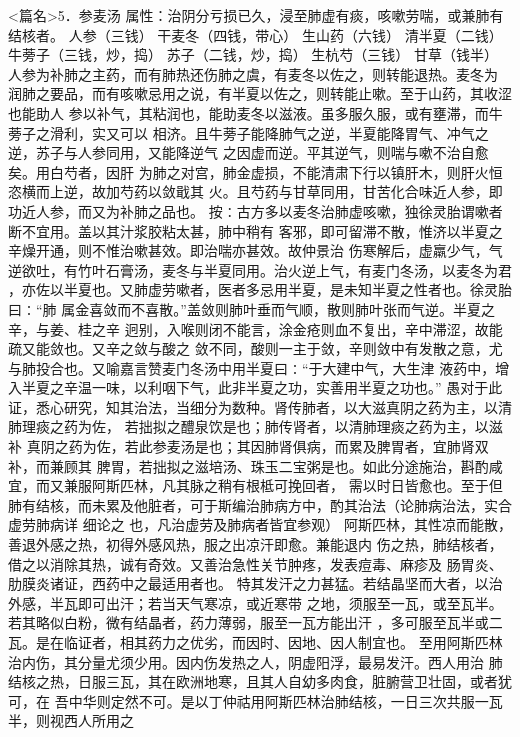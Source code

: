 \documentclass[a4paper,12pt,UTF8,twoside]{ctexbook}
\begin{document}
<篇名>5．参麦汤
属性：治阴分亏损已久，浸至肺虚有痰，咳嗽劳喘，或兼肺有结核者。 
人参（三钱） 干麦冬（四钱，带心） 生山药（六钱） 清半夏（二钱） 牛蒡子（三钱，炒，捣） 苏子（二钱，炒，捣） 
生杭芍（三钱） 甘草（钱半） 
人参为补肺之主药，而有肺热还伤肺之虞，有麦冬以佐之，则转能退热。麦冬为 
润肺之要品，而有咳嗽忌用之说，有半夏以佐之，则转能止嗽。至于山药，其收涩也能助人 
参以补气，其粘润也，能助麦冬以滋液。虽多服久服，或有壅滞，而牛蒡子之滑利，实又可以 
相济。且牛蒡子能降肺气之逆，半夏能降胃气、冲气之逆，苏子与人参同用，又能降逆气 
之因虚而逆。平其逆气，则喘与嗽不治自愈矣。用白芍者，因肝 
为肺之对宫，肺金虚损，不能清肃下行以镇肝木，则肝火恒恣横而上逆，故加芍药以敛戢其 
火。且芍药与甘草同用，甘苦化合味近人参，即功近人参，而又为补肺之品也。 
按∶古方多以麦冬治肺虚咳嗽，独徐灵胎谓嗽者断不宜用。盖以其汁浆胶粘太甚，肺中稍有 
客邪，即可留滞不散，惟济以半夏之辛燥开通，则不惟治嗽甚效。即治喘亦甚效。故仲景治 
伤寒解后，虚羸少气，气逆欲吐，有竹叶石膏汤，麦冬与半夏同用。治火逆上气，有麦门冬汤，以麦冬为君 
，亦佐以半夏也。又肺虚劳嗽者，医者多忌用半夏，是未知半夏之性者也。徐灵胎曰∶“肺 
属金喜敛而不喜散。”盖敛则肺叶垂而气顺，散则肺叶张而气逆。半夏之辛，与姜、桂之辛 
迥别，入喉则闭不能言，涂金疮则血不复出，辛中滞涩，故能疏又能敛也。又辛之敛与酸之 
敛不同，酸则一主于敛，辛则敛中有发散之意，尤与肺投合也。又喻嘉言赞麦门冬汤中用半夏曰∶“于大建中气，大生津 
液药中，增入半夏之辛温一味，以利咽下气，此非半夏之功，实善用半夏之功也。” 
愚对于此证，悉心研究，知其治法，当细分为数种。肾传肺者，以大滋真阴之药为主，以清肺理痰之药为佐， 
若拙拟之醴泉饮是也；肺传肾者，以清肺理痰之药为主，以滋补 
真阴之药为佐，若此参麦汤是也；其因肺肾俱病，而累及脾胃者，宜肺肾双补，而兼顾其 
脾胃，若拙拟之滋培汤、珠玉二宝粥是也。如此分途施治，斟酌咸宜，而又兼服阿斯匹林，凡其脉之稍有根柢可挽回者， 
需以时日皆愈也。至于但肺有结核，而未累及他脏者，可于斯编治肺病方中，酌其治法（论肺病治法，实合虚劳肺病详 
细论之 
也，凡治虚劳及肺病者皆宜参观） 
阿斯匹林，其性凉而能散，善退外感之热，初得外感风热，服之出凉汗即愈。兼能退内 
伤之热，肺结核者，借之以消除其热，诚有奇效。又善治急性关节肿疼，发表痘毒、麻疹及 
肠胃炎、肋膜炎诸证，西药中之最适用者也。 
特其发汗之力甚猛。若结晶坚而大者，以治外感，半瓦即可出汗；若当天气寒凉，或近寒带 
之地，须服至一瓦，或至瓦半。若其略似白粉，微有结晶者，药力薄弱，服至一瓦方能出汗 
，多可服至瓦半或二瓦。是在临证者，相其药力之优劣，而因时、因地、因人制宜也。 
至用阿斯匹林治内伤，其分量尤须少用。因内伤发热之人，阴虚阳浮，最易发汗。西人用治 
肺结核之热，日服三瓦，其在欧洲地寒，且其人自幼多肉食，脏腑营卫壮固，或者犹可，在 
吾中华则定然不可。是以丁仲祜用阿斯匹林治肺结核，一日三次共服一瓦半，则视西人所用之 
\end{document}
